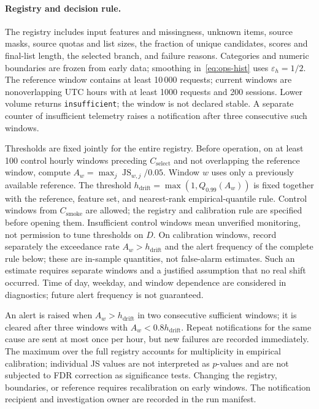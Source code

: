 \documentclass[12pt,a4paper]{article}
\newcommand{\code}[1]{{\ttfamily\small\nolinkurl{#1}}}
\newcommand{\eps}{\varepsilon}
\theoremstyle{plainru}
\begin{document}
\paragraph{Registry and decision rule.}\label{sec:ops-drift-rule}
The registry includes input features and missingness, unknown items,
source masks, source quotas and list sizes, the fraction of unique candidates,
scores and final-list length, the selected branch, and failure reasons.
Categories and numeric boundaries are frozen from early data;
smoothing in~\eqref{eq:ops-hist} uses $\eps_h=1/2$.
The reference window contains at least 10\,000 requests; current windows are
nonoverlapping UTC hours with at least 1000 requests and 200 sessions.
Lower volume returns \code{insufficient}; the window is not declared
stable. A separate counter of insufficient telemetry
raises a notification after three consecutive such windows.

Thresholds are fixed jointly for the entire registry. Before operation,
on at least 100 control hourly windows preceding
$C_{\mathrm{select}}$ and not overlapping the reference window, compute
$A_w=\max_j\operatorname{JS}_{w,j}/0.05$. Window $w$ uses
only a previously available reference. The threshold
$h_{\mathrm{drift}}=\max(1,Q_{0.99}(A_w))$ is fixed together
with the reference, feature set, and nearest-rank empirical-quantile rule.
Control windows from $C_{\mathrm{smoke}}$ are allowed; the registry
and calibration rule are specified before opening them. Insufficient control windows
mean unverified monitoring, not permission to tune thresholds
on $D$. On calibration windows, record separately the exceedance rate
$A_w>h_{\mathrm{drift}}$ and the alert frequency of the complete rule below;
these are in-sample quantities, not false-alarm estimates.
Such an estimate requires separate windows and a justified assumption
that no real shift occurred. Time of day, weekday, and window
dependence are considered in diagnostics; future alert frequency is not guaranteed.

An alert is raised when $A_w>h_{\mathrm{drift}}$ in two consecutive
sufficient windows; it is cleared after three windows with
$A_w<0.8h_{\mathrm{drift}}$. Repeat notifications for the same cause
are sent at most once per hour, but new failures are recorded immediately.
The maximum over the full registry accounts for multiplicity in empirical
calibration; individual JS values are not interpreted as $p$-values
and are not subjected to FDR correction as significance tests.
Changing the registry, boundaries, or reference requires recalibration on early windows.
The notification recipient and investigation owner are recorded in the run manifest.
\end{document}
